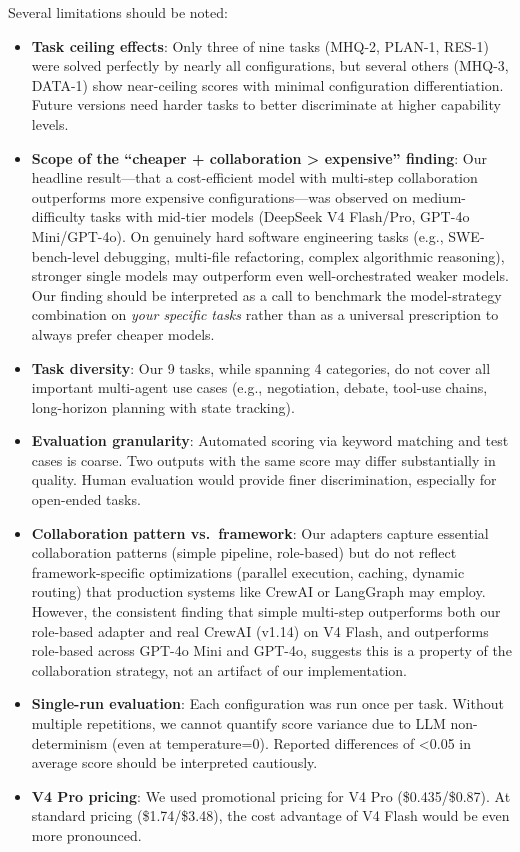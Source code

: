 \documentclass[sigconf,nonacm]{acmart}
\begin{document}
Several limitations should be noted:
\begin{itemize}
    \item \textbf{Task ceiling effects}: Only three of nine tasks (MHQ-2, PLAN-1, RES-1) were solved perfectly by nearly all configurations, but several others (MHQ-3, DATA-1) show near-ceiling scores with minimal configuration differentiation. Future versions need harder tasks to better discriminate at higher capability levels.
    \item \textbf{Scope of the ``cheaper + collaboration > expensive'' finding}: Our headline result—that a cost-efficient model with multi-step collaboration outperforms more expensive configurations—was observed on medium-difficulty tasks with mid-tier models (DeepSeek V4 Flash/Pro, GPT-4o Mini/GPT-4o). On genuinely hard software engineering tasks (e.g., SWE-bench-level debugging, multi-file refactoring, complex algorithmic reasoning), stronger single models may outperform even well-orchestrated weaker models. Our finding should be interpreted as a call to benchmark the model-strategy combination on \emph{your specific tasks} rather than as a universal prescription to always prefer cheaper models.
    \item \textbf{Task diversity}: Our 9 tasks, while spanning 4 categories, do not cover all important multi-agent use cases (e.g., negotiation, debate, tool-use chains, long-horizon planning with state tracking).
    \item \textbf{Evaluation granularity}: Automated scoring via keyword matching and test cases is coarse. Two outputs with the same score may differ substantially in quality. Human evaluation would provide finer discrimination, especially for open-ended tasks.
    \item \textbf{Collaboration pattern vs.\ framework}: Our adapters capture essential collaboration patterns (simple pipeline, role-based) but do not reflect framework-specific optimizations (parallel execution, caching, dynamic routing) that production systems like CrewAI or LangGraph may employ. However, the consistent finding that simple multi-step outperforms both our role-based adapter and real CrewAI (v1.14) on V4 Flash, and outperforms role-based across GPT-4o Mini and GPT-4o, suggests this is a property of the collaboration strategy, not an artifact of our implementation.
    \item \textbf{Single-run evaluation}: Each configuration was run once per task. Without multiple repetitions, we cannot quantify score variance due to LLM non-determinism (even at temperature=0). Reported differences of <0.05 in average score should be interpreted cautiously.
    \item \textbf{V4 Pro pricing}: We used promotional pricing for V4 Pro (\$0.435/\$0.87). At standard pricing (\$1.74/\$3.48), the cost advantage of V4 Flash would be even more pronounced.
\end{itemize}
\end{document}
